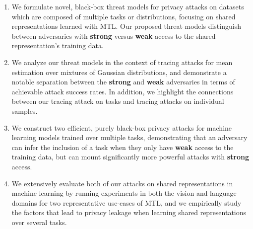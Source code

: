 \begin{enumerate}[labelsep=*,leftmargin=15pt]
    \item We formulate novel, black-box threat models for privacy attacks on datasets which are composed of multiple tasks or distributions, focusing on shared representations learned with MTL. Our proposed threat models distinguish between adversaries with \textbf{strong} versus \textbf{weak} access to the shared representation's training data.
    \item We analyze our threat models in the context of tracing attacks for mean estimation over mixtures of Gaussian distributions, and demonstrate a notable separation between the \textbf{strong} and \textbf{weak} adversaries in terms of achievable attack success rates. In addition, we highlight the connections between our tracing attack on tasks and tracing attacks on individual samples. 
    \item We construct two efficient, purely black-box privacy attacks for machine learning models trained over multiple tasks, demonstrating that an adversary can infer the inclusion of a task when they only have \textbf{weak} access to the training data, but can mount significantly more powerful attacks with \textbf{strong} access.
    \item We extensively evaluate both of our attacks on shared representations in machine learning by running experiments in both the vision and language domains for two representative use-cases of MTL, and we empirically study the factors that lead to privacy leakage when learning shared representations over several tasks.
\end{enumerate}
